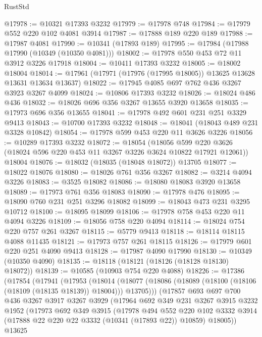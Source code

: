 \begin{lexlean}{RustStd}
\begin{coremodule}
{\begin{coremodule}
{{{{{{{{{{{{{{{{{{{{{{{{{@17978 := @10321 @17393 @3232
@17979 := @17978 @748
@17984 := @17979 @552 @220 @102 @4081 @3914
@17987 := @17888 @189 @220 @189
@17988 := @17987 @4081
@17990 := @10341 (@17893 @189)
@17995 := @17984 (@17988 @17990 (@10349 (@10350 @4081)))
@18002 := @17978 @550 @453 @72 @11 @3912 @3226 @17918
@18004 := @10411 @17393 @3232
@18005 := @18002 @18004
@18014 := @17961 (@17971 (@17976 (@17995 @18005)) @13625 @13628 @13631 @13634 @13637)
@18022 := @17945 @4085 @697 @762 @436 @3267 @3923 @3267 @4099
@18024 := @10806 @17393 @3232
@18026 := @18024 @486 @436
@18032 := @18026 @696 @356 @3267 @13655 @3920 @13658
@18035 := @17973 @696 @356 @13655
@18041 := @17978 @492 @601 @231 @251 @3329 @9413
@18043 := @10700 @17393 @3232
@18048 := @18041 (@18043 @489 @231 @3328 @10842)
@18054 := @17978 @599 @453 @220 @11 @3626 @3226
@18056 := @10289 @17393 @3232
@18072 := @18054
    (@18056 @599 @220 @3626 (@18024 @596 @220 @453 @11 @3267 @3226 @3624 @10822 @17921 @12061))
    @18004
@18076 := @18032 (@18035 (@18048 @18072)) @13705
@18077 := @18022 @18076
@18080 := @18026 @761 @356 @3267
@18082 := @3214 @4094 @3226
@18083 := @3525 @18082
@18086 := @18080 @18083 @3920 @13658
@18089 := @17973 @761 @356 @18083
@18090 := @17978 @476
@18095 := @18090 @760 @231 @251 @3296 @18082
@18099 := @18043 @473 @231 @3295 @10712
@18100 := @18095 @18099
@18106 := @17978 @758 @453 @220 @11 @4094 @3226
@18109 := @18056 @758 @220 @4094
@18114 := @18024 @754 @220 @757 @261 @3267
@18115 := @5779 @9413
@18118 := @18114 @18115 @4088 @11435
@18121 := @17973 @757 @261 @18115
@18126 := @17979 @601 @220 @251 @4090 @9413
@18128 := @17987 @4090 @17990
@18130 := @10349 (@10350 @4090)
@18135 := @18118 (@18121 (@18126 (@18128 @18130) @18072))
@18139 := @10585 (@10903 @754 @220 @4088)
@18226 := @17386
    (@17854
      (@17941
        (@17953
          (@18014
            (@18077 (@18086 (@18089 (@18100 (@18106 (@18109 (@18135 @18139)) @18004))) @13705)))
          (@17857
            @693
            @697
            @700
            @436
            @3267
            @3917
            @3267
            @3929
            (@17964
              @692
              @349
              @231
              @3267
              @3915
              @3232
              @1952
              (@17973
                @692
                @349
                @3915
                (@17978
                  @494
                  @552
                  @220
                  @102
                  @3332
                  @3914
                  (@17888 @22 @220 @22 @3332 (@10341 (@17893 @22)) @10859)
                  @18005))
              @13625
}}}}}}}}}}}}}}}}}}}}}}}}}
\end{coremodule}}
\end{coremodule}
\end{lexlean}
